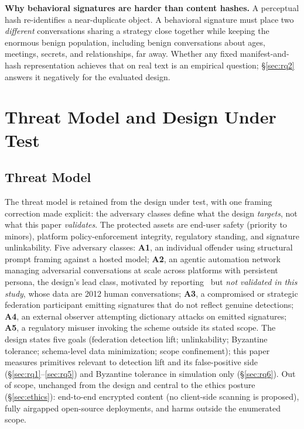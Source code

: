 \documentclass[letterpaper,twocolumn,10pt]{article}
\begin{document}
\textbf{Why behavioral signatures are harder than content hashes.} A
perceptual hash re-identifies a near-duplicate object. A behavioral
signature must place two \emph{different} conversations sharing a strategy
close together while keeping the enormous benign population, including
benign conversations about ages, meetings, secrets, and relationships,
far away. Whether any fixed manifest-and-hash representation achieves that
on real text is an empirical question; \S\ref{sec:rq2} answers it negatively
for the evaluated design.

\section{Threat Model and Design Under Test}
\label{sec:threat}

\subsection{Threat Model}
The threat model is retained from the design under test, with one framing
correction made explicit: the adversary classes define what the design
\emph{targets}, not what this paper \emph{validates}. The protected assets
are end-user safety (priority to minors), platform policy-enforcement
integrity, regulatory standing, and signature unlinkability. Five adversary
classes: \textbf{A1}, an individual offender using structural prompt framing
against a hosted model; \textbf{A2}, an agentic automation network managing
adversarial conversations at scale across platforms with persistent persona,
the design's lead class, motivated by reporting~\cite{lantern2026} but
\emph{not validated in this study}, whose data are 2012 human conversations;
\textbf{A3}, a compromised or strategic federation participant emitting
signatures that do not reflect genuine detections; \textbf{A4}, an external
observer attempting dictionary attacks on emitted signatures; \textbf{A5}, a
regulatory misuser invoking the scheme outside its stated scope. The design
states five goals (federation detection lift; unlinkability; Byzantine
tolerance; schema-level data minimization; scope confinement); this paper
measures primitives relevant to detection lift and its false-positive side
(\S\ref{sec:rq1}--\ref{sec:rq5}) and Byzantine tolerance in simulation only
(\S\ref{sec:rq6}). Out of scope, unchanged from the design and central
to the ethics posture (\S\ref{sec:ethics}): end-to-end encrypted content
(no client-side scanning is proposed), fully airgapped open-source
deployments, and harms outside the enumerated scope.
\end{document}
